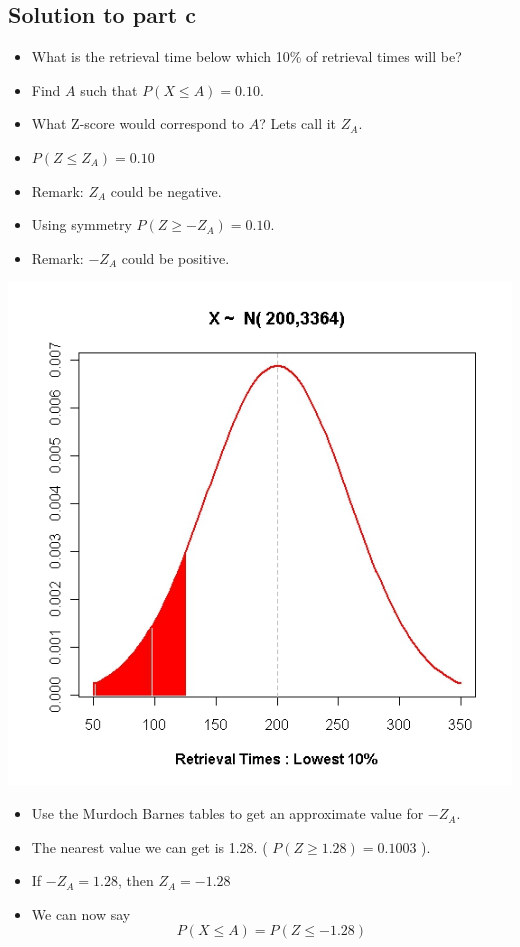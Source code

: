 \documentclass[a4paper,12pt]{article}
\begin{document}
\subsection*{Solution to part c}
	\begin{itemize}
		\item What is the retrieval time below which 10\% of retrieval times will be?
		\item Find $A$ such that $P(X \leq A) = 0.10$.
		\item What Z-score would correspond to $A$? Lets call it $Z_A$.
		\item $P(Z  \leq Z_A) = 0.10$
		\item Remark: $Z_A$ could be negative.
		\item Using symmetry $P(Z \geq -Z_A) = 0.10$.
		\item Remark: $-Z_A$ could be positive.
	\end{itemize}


	
\begin{center}
\includegraphics[scale=0.40]{images/5BNormal4}
\end{center}
	

	\begin{itemize}
		\item Use the Murdoch Barnes tables to get an approximate value for $-Z_A$.
		\item The nearest value we can get is 1.28. ( $P( Z \geq 1.28) = 0.1003$ ).
		\item If $-Z_A = 1.28$, then $Z_A=-1.28$
		\item We can now say
		\[ P(X \leq A) = P(Z \leq -1.28) \]
		
	\end{itemize}
\end{document}
